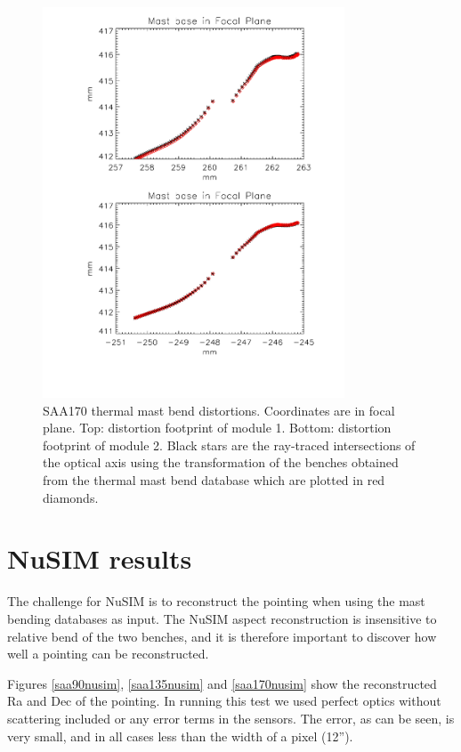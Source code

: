 \begin{figure}[tb]
\begin{center}
\includegraphics[width=0.8\textwidth]{images/saa170mastbend1.pdf}
\caption{SAA170 thermal mast bend distortions. Coordinates are in focal plane. Top: distortion footprint of module 1. Bottom: distortion footprint of module 2. Black stars are the ray-traced intersections of the optical axis using the transformation of the benches obtained from the thermal mast bend database which are plotted in red diamonds.}
\label{saa170sim}
\end{center}
\end{figure}

\section{NuSIM results}

The challenge for NuSIM is to reconstruct the pointing when using the mast bending databases as input. The NuSIM aspect reconstruction is insensitive to relative bend of the two benches, and it is therefore important to discover how well a pointing can be reconstructed.

Figures \ref{saa90nusim}, \ref{saa135nusim} and \ref{saa170nusim} show the reconstructed Ra and Dec of the pointing. In running this test we used perfect optics without scattering included or any error terms in the sensors. The error, as can be seen, is very small, and in all cases less than the width of a pixel (12''). 

